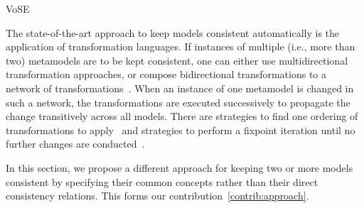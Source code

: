 \begin{copiedFrom}{VoSE}

The state-of-the-art approach to keep models consistent automatically is the application of transformation languages.
If instances of multiple (i.e., more than two) metamodels are to be kept consistent, one can either use multidirectional transformation approaches, or compose bidirectional transformations to a network of transformations~\cite{cleve2019dagstuhl}.
When an instance of one metamodel is changed in such a network, the transformations are executed successively to propagate the change transitively across all models.
There are strategies to find one ordering of transformations to apply~\cite{stevens2017a} and strategies to perform a fixpoint iteration until no further changes are conducted~\cite{klare2019icmt}.

In this section, we propose a different approach for keeping two or more models consistent by specifying their common concepts rather than their direct consistency relations.
This forms our contribution~\ref{contrib:approach}.




\end{copiedFrom}
